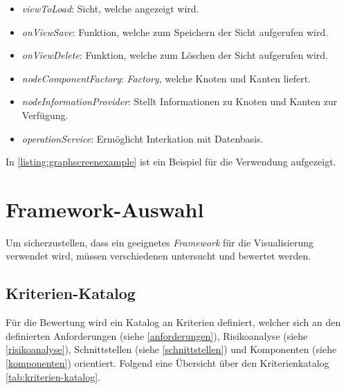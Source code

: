 \begin{itemize}
    \item \textit{viewToLoad}: Sicht, welche angezeigt wird.
    \item \textit{onViewSave}: Funktion, welche zum Speichern der Sicht aufgerufen wird.
    \item \textit{onViewDelete}: Funktion, welche zum Löschen der Sicht aufgerufen wird.
    \item \textit{nodeComponentFactory}: \textit{Factory}, welche Knoten und Kanten liefert.
    \item \textit{nodeInformationProvider}: Stellt Informationen zu Knoten und Kanten zur Verfügung.
    \item \textit{operationService}: Ermöglicht Interkation mit Datenbasis.
\end{itemize}


In \autoref{listing:graphscreenexample} ist ein Beispiel für die Verwendung aufgezeigt. 


\section{Framework-Auswahl}
Um sicherzustellen, dass ein geeignetes \textit{Framework} für die Visualisierung verwendet wird, müssen verschiedenen untersucht und bewertet werden.
\subsection{Kriterien-Katalog}
Für die Bewertung wird ein Katalog an Kriterien definiert, welcher sich an den definierten Anforderungen (siehe \autoref{anforderungen}), Risikoanalyse (siehe \autoref{risikoanalyse}), Schnittstellen (siehe \autoref{schnittstellen}) und Komponenten (siehe \autoref{komponenten}) orientiert. Folgend eine Übersicht über den Kriterienkatalog \autoref{tab:kriterien-katalog}. 

